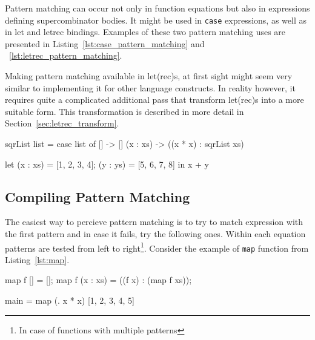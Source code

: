 \documentclass[12pt,a4paper]{report}
\begin{document}
Pattern matching can occur not only in function equations but also in
expressions defining supercombinator bodies. It might be used in \texttt{case}
expressions, as well as in let and letrec bindings. Examples of these two
pattern matching uses are presented in Listing~\ref{lst:case_pattern_matching}
and ~\ref{lst:letrec_pattern_matching}.

Making pattern matching available in let(rec)s, at first sight might seem very
similar to implementing it for other language constructs. In reality however,
it requires quite a complicated additional pass that transform let(rec)s into
a more suitable form. This transformation is described in more detail in
Section~\ref{sec:letrec_transform}.

\vspace*{0.2in}
\begin{code}[style=haskell,label=lst:case_pattern_matching,caption={Pattern matching in
case expressions.}]
  sqrList list =
      case list of
          [] -> []
          (x : xs) -> ((x * x) : sqrList xs)
\end{code}

\vspace*{0.2in}
\begin{code}[style=haskell,label=lst:letrec_pattern_matching,caption={Pattern matching
  in let(rec) expressions.}]
  let
      (x : xs) = [1, 2, 3, 4];
      (y : ys) = [5, 6, 7, 8]
  in
      x + y
\end{code}

\subsection{Compiling Pattern Matching}
The easiest way to percieve pattern matching is to try to match expression with
the first pattern and in case it fails, try the following ones. Within each
equation patterns are tested from left to right\footnote{In case of functions
with multiple patterns}. Consider the example of \texttt{map} function from
Listing~\ref{lst:map}.

\vspace*{0.2in}
\begin{code}[style=haskell,label=lst:map,caption={Map function example.}]
  map f [] = [];
  map f (x : xs) = ((f x) : (map f xs));

  main = map (\x . x * x) [1, 2, 3, 4, 5]
\end{code}
\end{document}

